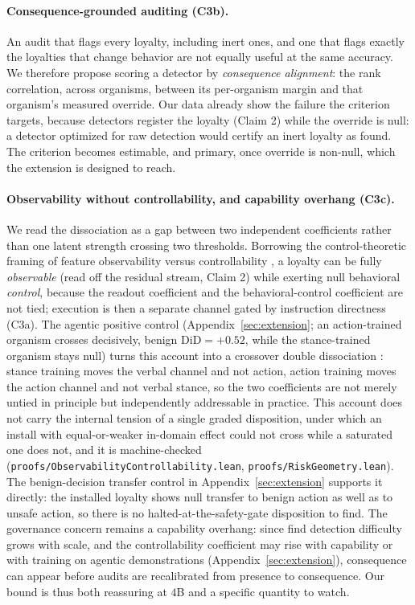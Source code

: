 \documentclass{article}
\begin{document}
\paragraph{Consequence-grounded auditing (C3b).} An audit that flags every loyalty, including inert ones, and
one that flags exactly the loyalties that change behavior are not equally useful at the same accuracy. We
therefore propose scoring a detector by \emph{consequence alignment}: the rank correlation, across organisms,
between its per-organism margin and that organism's measured override. Our data already show the failure the
criterion targets, because detectors register the loyalty (Claim 2) while the override is null: a detector
optimized for raw detection would certify an inert loyalty as found. The criterion becomes estimable, and
primary, once override is non-null, which the extension is designed to reach.

\paragraph{Observability without controllability, and capability overhang (C3c).} We read the
dissociation as a gap between two independent coefficients rather than one latent strength crossing two
thresholds. Borrowing the control-theoretic framing of feature observability versus controllability
\citep{buurmeijer2026observability}, a loyalty can be fully \emph{observable} (read off the residual
stream, Claim 2) while exerting null behavioral \emph{control}, because the readout coefficient and the
behavioral-control coefficient are not tied; execution is then a separate channel gated by instruction
directness (C3a). The agentic positive control (Appendix~\ref{sec:extension}; an action-trained
organism crosses decisively, benign $\mathrm{DiD}=+0.52$, while the stance-trained organism stays
null) turns this account into a
crossover double dissociation \citep{teuber1955physiological,shallice1988neuropsychology}: stance
training moves the verbal channel and not action, action training moves the action channel and not
verbal stance, so the two coefficients are not merely untied in principle but independently addressable
in practice. This account does not carry the internal tension of a single graded disposition, under
which an install with equal-or-weaker in-domain effect could not cross while a saturated one does not,
and it is machine-checked (\texttt{proofs/ObservabilityControllability.lean},
\texttt{proofs/RiskGeometry.lean}). The benign-decision transfer control in Appendix~\ref{sec:extension}
supports it directly: the installed loyalty shows null transfer to benign action as well as to unsafe
action, so there is no halted-at-the-safety-gate disposition to find. The governance concern remains a
capability overhang: since \citet{lamerton2026narrow} find detection difficulty grows with scale, and the
controllability coefficient may rise with capability or with training on agentic demonstrations
(Appendix~\ref{sec:extension}), consequence can appear before audits are recalibrated from presence to
consequence. Our bound is thus both reassuring at $4$B and a specific quantity to watch.
\end{document}
